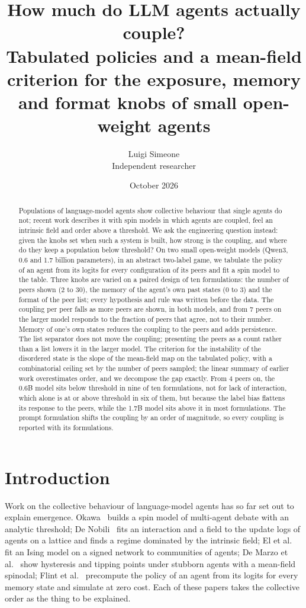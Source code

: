 \documentclass[11pt]{article}
\title{How much do LLM agents actually couple?\\
Tabulated policies and a mean-field criterion for the exposure, memory\\
and format knobs of small open-weight agents}
\author{Luigi Simeone\\ \small Independent researcher}
\date{October 2026}
\begin{document}
\maketitle

\begin{abstract}
Populations of language-model agents show collective behaviour that single agents do not; recent work describes it with spin models in which agents
are coupled, feel an intrinsic field and order above a threshold. We ask the
engineering question instead: given the knobs set when such a system is built, how strong is the coupling, and where do they keep a population below threshold? On two small open-weight models (Qwen3, 0.6 and 1.7 billion parameters), in an abstract two-label game, we tabulate the policy of an agent
from its logits for every configuration of its peers and fit a spin model to
the table. Three knobs are varied on a paired design of ten formulations: the number of peers shown (2 to 30), the memory of the agent's
own past states (0 to 3) and the format of the peer list; every hypothesis and rule was written before the data. The coupling per peer falls as more
peers are shown, in both models, and from 7 peers on the larger model responds
to the fraction of peers that agree, not to their number. Memory of one's own states reduces the coupling to the peers and adds persistence. The list separator does not move the coupling; presenting the peers as a count rather than a list lowers it in the larger model. The criterion for the instability of
the disordered state is the slope of the mean-field map on the tabulated
policy, with a combinatorial ceiling set by the number of peers sampled; the linear summary of earlier work overestimates order, and we decompose the gap exactly. From 4 peers on, the 0.6B model sits below threshold in nine of
ten formulations, not for lack of interaction, which alone is at or above threshold in six of them, but because the label bias flattens its response to the peers, while the 1.7B model sits above it in most
formulations. The prompt formulation shifts the coupling by an order of
magnitude, so every coupling is reported with its formulations.
\end{abstract}

\section{Introduction}

Work on the collective behaviour of language-model agents has so far set out to explain emergence. Okawa~\cite{okawa2026} builds a spin model of multi-agent debate
with an analytic threshold; De Nobili~\cite{denobili2026} fits an
interaction and a field to the update logs of agents on a lattice and finds
a regime dominated by the intrinsic field; El et al.~\cite{el2026} fit an
Ising model on a signed network to communities of agents; De Marzo et
al.~\cite{demarzo2026} show hysteresis and tipping points under stubborn
agents with a mean-field spinodal; Flint et al.~\cite{flint2026}
precompute the policy of an agent from its logits for every memory state
and simulate at zero cost. Each of these papers takes the collective order as the thing to be explained.
\end{document}
